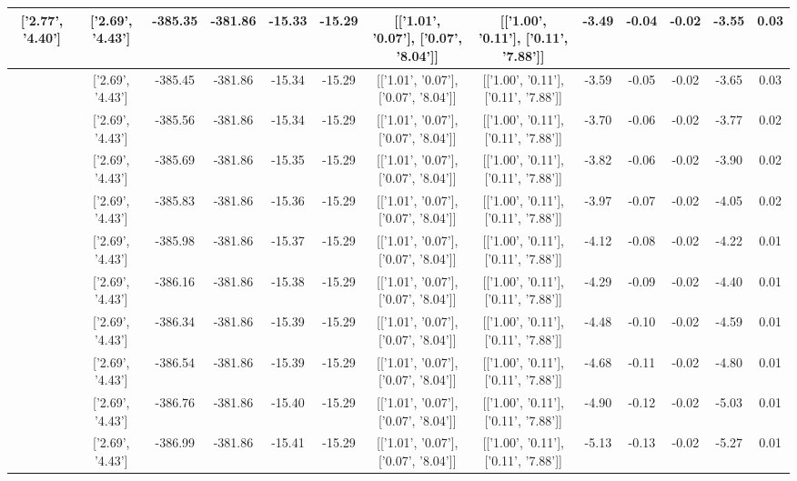 \begin{table}[htbp]
\begin{adjustbox}{angle=90}
\begin{tabular}{|c|c|c|c|c|c|c|c|c|c|c|c|c|}
 ['2.77', '4.40'] & ['2.69', '4.43'] & -385.35 & -381.86 & -15.33 & -15.29 & [['1.01', '0.07'], ['0.07', '8.04']] & [['1.00', '0.11'], ['0.11', '7.88']] & -3.49 & -0.04 & -0.02 & -3.55 & 0.03\\ \hline
 ['2.78', '4.39'] & ['2.69', '4.43'] & -385.45 & -381.86 & -15.34 & -15.29 & [['1.01', '0.07'], ['0.07', '8.04']] & [['1.00', '0.11'], ['0.11', '7.88']] & -3.59 & -0.05 & -0.02 & -3.65 & 0.03\\ \hline
 ['2.79', '4.38'] & ['2.69', '4.43'] & -385.56 & -381.86 & -15.34 & -15.29 & [['1.01', '0.07'], ['0.07', '8.04']] & [['1.00', '0.11'], ['0.11', '7.88']] & -3.70 & -0.06 & -0.02 & -3.77 & 0.02\\ \hline
 ['2.80', '4.38'] & ['2.69', '4.43'] & -385.69 & -381.86 & -15.35 & -15.29 & [['1.01', '0.07'], ['0.07', '8.04']] & [['1.00', '0.11'], ['0.11', '7.88']] & -3.82 & -0.06 & -0.02 & -3.90 & 0.02\\ \hline
 ['2.82', '4.37'] & ['2.69', '4.43'] & -385.83 & -381.86 & -15.36 & -15.29 & [['1.01', '0.07'], ['0.07', '8.04']] & [['1.00', '0.11'], ['0.11', '7.88']] & -3.97 & -0.07 & -0.02 & -4.05 & 0.02\\ \hline
 ['2.83', '4.37'] & ['2.69', '4.43'] & -385.98 & -381.86 & -15.37 & -15.29 & [['1.01', '0.07'], ['0.07', '8.04']] & [['1.00', '0.11'], ['0.11', '7.88']] & -4.12 & -0.08 & -0.02 & -4.22 & 0.01\\ \hline
 ['2.84', '4.36'] & ['2.69', '4.43'] & -386.16 & -381.86 & -15.38 & -15.29 & [['1.01', '0.07'], ['0.07', '8.04']] & [['1.00', '0.11'], ['0.11', '7.88']] & -4.29 & -0.09 & -0.02 & -4.40 & 0.01\\ \hline
 ['2.85', '4.35'] & ['2.69', '4.43'] & -386.34 & -381.86 & -15.39 & -15.29 & [['1.01', '0.07'], ['0.07', '8.04']] & [['1.00', '0.11'], ['0.11', '7.88']] & -4.48 & -0.10 & -0.02 & -4.59 & 0.01\\ \hline
 ['2.87', '4.35'] & ['2.69', '4.43'] & -386.54 & -381.86 & -15.39 & -15.29 & [['1.01', '0.07'], ['0.07', '8.04']] & [['1.00', '0.11'], ['0.11', '7.88']] & -4.68 & -0.11 & -0.02 & -4.80 & 0.01\\ \hline
 ['2.88', '4.34'] & ['2.69', '4.43'] & -386.76 & -381.86 & -15.40 & -15.29 & [['1.01', '0.07'], ['0.07', '8.04']] & [['1.00', '0.11'], ['0.11', '7.88']] & -4.90 & -0.12 & -0.02 & -5.03 & 0.01\\ \hline
 ['2.89', '4.33'] & ['2.69', '4.43'] & -386.99 & -381.86 & -15.41 & -15.29 & [['1.01', '0.07'], ['0.07', '8.04']] & [['1.00', '0.11'], ['0.11', '7.88']] & -5.13 & -0.13 & -0.02 & -5.27 & 0.01\\ \hline

\end{tabular}
\end{adjustbox}
\end{table}
